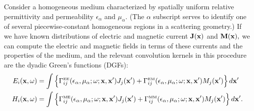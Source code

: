 \documentclass[dvips,letterpaper]{article}
\begin{document}
Consider a homogeneous medium characterized by spatially uniform 
relative permittivity and permeability $\epsilon_\alpha$ and 
$\mu_\alpha$. (The $\alpha$ subscript serves to identify one of 
several piecewise-constant homogeneous regions in a \lss scattering 
geometry.) 
If we have
known distributions of electric and magnetic current
$\mathbf{J}(\mathbf{x})$ and $\mathbf{M}(\mathbf{x}),$
we can compute the electric and magnetic fields in terms
of these currents and the properties of the medium, and  
the relevant convolution kernels in this procedure are
the dyadic Green's functions (DGFs):
\begin{align*}
 E_i(\mathbf{x}, \omega) 
&= 
   \int
    \Big\{
     \Gamma^{\hbox{\tiny{EE}}}_{ij}(\epsilon_\alpha, \mu_\alpha; \omega; \mathbf{x}, \mathbf{x}^\prime) 
     J_j(\mathbf{x}^\prime)
     +
     \Gamma^{\hbox{\tiny{EM}}}_{ij}(\epsilon_\alpha, \mu_\alpha; \omega; \mathbf{x}, \mathbf{x}^\prime) 
     M_j(\mathbf{x}^\prime)
    \Big\}
    \, d\mathbf{x}^\prime
\\
 H_i(\mathbf{x}, \omega) 
&= 
   \int
    \Big\{
     \Gamma^{\hbox{\tiny{ME}}}_{ij}(\epsilon_\alpha, \mu_\alpha; \omega; \mathbf{x}, \mathbf{x}^\prime) 
     J_j(\mathbf{x}^\prime)
     +
     \Gamma^{\hbox{\tiny{MM}}}_{ij}(\epsilon_\alpha, \mu_\alpha; \omega; \mathbf{x}, \mathbf{x}^\prime) 
     M_j(\mathbf{x}^\prime)
    \Big\}
    \, d\mathbf{x}^\prime.
\end{align*}
\end{document}
